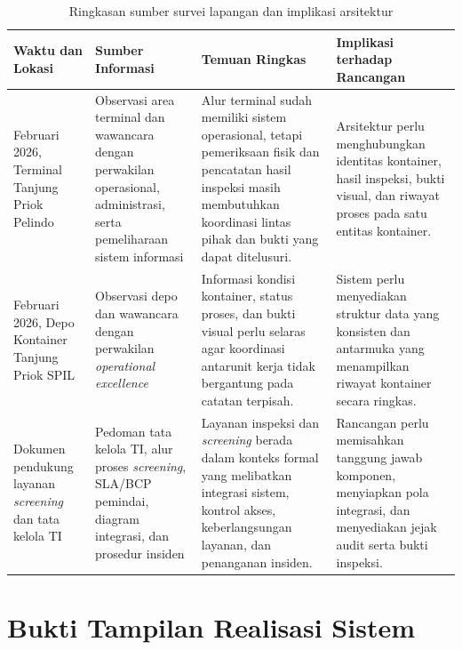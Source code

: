 \begin{table}[htbp]
  \centering
  \scriptsize
  \caption{Ringkasan sumber survei lapangan dan implikasi arsitektur}
  \label{tbl:ringkasan-sumber-survei}
  \setlength{\tabcolsep}{3pt}
  \renewcommand{\arraystretch}{1.12}
  \begin{tabularx}{\textwidth}{>{\raggedright\arraybackslash}p{} >{\raggedright\arraybackslash}p{} >{\raggedright\arraybackslash}X >{\raggedright\arraybackslash}X}
    \toprule
    \textbf{Waktu dan Lokasi} & \textbf{Sumber Informasi} & \textbf{Temuan Ringkas} & \textbf{Implikasi terhadap Rancangan} \\
    \midrule
    3 Februari 2026, Terminal Tanjung Priok Pelindo &
    Observasi area terminal dan wawancara dengan perwakilan operasional, administrasi, serta pemeliharaan sistem informasi &
    Alur terminal sudah memiliki sistem operasional, tetapi pemeriksaan fisik dan pencatatan hasil inspeksi masih membutuhkan koordinasi lintas pihak dan bukti yang dapat ditelusuri. &
    Arsitektur perlu menghubungkan identitas kontainer, hasil inspeksi, bukti visual, dan riwayat proses pada satu entitas kontainer. \\
    26 Februari 2026, Depo Kontainer Tanjung Priok SPIL &
    Observasi depo dan wawancara dengan perwakilan \textit{operational excellence} &
    Informasi kondisi kontainer, status proses, dan bukti visual perlu selaras agar koordinasi antarunit kerja tidak bergantung pada catatan terpisah. &
    Sistem perlu menyediakan struktur data yang konsisten dan antarmuka yang menampilkan riwayat kontainer secara ringkas. \\
    Dokumen pendukung layanan \textit{screening} dan tata kelola TI &
    Pedoman tata kelola TI, alur proses \textit{screening}, SLA/BCP pemindai, diagram integrasi, dan prosedur insiden &
    Layanan inspeksi dan \textit{screening} berada dalam konteks formal yang melibatkan integrasi sistem, kontrol akses, keberlangsungan layanan, dan penanganan insiden. &
    Rancangan perlu memisahkan tanggung jawab komponen, menyiapkan pola integrasi, dan menyediakan jejak audit serta bukti inspeksi. \\
    \bottomrule
  \end{tabularx}
\end{table}

\FloatBarrier

\section{Bukti Tampilan Realisasi Sistem}
\label{sec:bukti_tampilan_realisasi}

